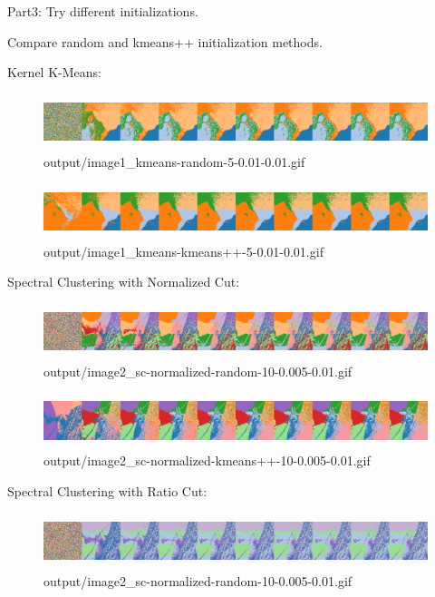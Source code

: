 \documentclass{homework}
\begin{document}
Part3: Try different initializations.

Compare random and kmeans++ initialization methods.

Kernel K-Means:

\begin{figure}[H]
    \centering
    \includegraphics[height=1.6cm]{output_flatgif/flatgif_image1_kmeans-random-5-0.01-0.01.png}
    \caption{output/image1\_kmeans-random-5-0.01-0.01.gif}
\end{figure}

\begin{figure}[H]
    \centering
    \includegraphics[height=1.6cm]{output_flatgif/flatgif_image1_kmeans-kmeans++-5-0.01-0.01.png}
    \caption{output/image1\_kmeans-kmeans++-5-0.01-0.01.gif}
\end{figure}

Spectral Clustering with Normalized Cut:

\begin{figure}[H]
    \centering
    \includegraphics[height=1.6cm]{output_flatgif/flatgif_image2_sc-normalized-random-10-0.005-0.01.png}
    \caption{output/image2\_sc-normalized-random-10-0.005-0.01.gif}
\end{figure}

\begin{figure}[H]
    \centering
    \includegraphics[height=1.6cm]{output_flatgif/flatgif_image2_sc-normalized-kmeans++-10-0.005-0.01.png}
    \caption{output/image2\_sc-normalized-kmeans++-10-0.005-0.01.gif}
\end{figure}

Spectral Clustering with Ratio Cut:

\begin{figure}[H]
    \centering
    \includegraphics[height=1.6cm]{output_flatgif/flatgif_image2_sc-ratio-random-10-0.005-0.01.png}
    \caption{output/image2\_sc-normalized-random-10-0.005-0.01.gif}
\end{figure}
\end{document}
